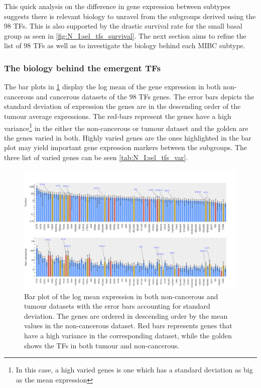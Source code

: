 This quick analysis on the difference in gene expression between subtypes suggests there is relevant biology to unravel from the subgroups derived using the 98 TFs. This is also supported by the drastic survival rate for the small basal group as seen in \cref{fig:N_I:sel_tfs_survival}. The next section aims to refine the list of 98 TFs as well as to investigate the biology behind each MIBC subtype.

\subsubsection{The biology behind the emergent TFs} \label{s:N_I:sel_tfs_bio}

The bar plots in \cref{fig:N_I:sel_tfs_var} display the log mean of the gene expression in both non-cancerous and cancerous datasets of the 98 TFs genes. The error bars depicts the standard deviation of expression the genes are in the descending order of the tumour average expressions. The red-bars represent the genes have a high variance\footnote{In this case, a high varied genes is one which has a standard deviation as big as the mean expression} in the either the non-cancerous or tumour dataset and the golden are the genes varied in both. Highly varied genes are the ones highlighted in the bar plot may yield important gene expression markers between the subgroups. The three list of varied genes can be seen \cref{tab:N_I:sel_tfs_var}.


\begin{figure}[!ht]   
\centering
\includegraphics[width=1.0\textwidth,height=1.0\textheight,keepaspectratio]{Sections/Network_I/Resources/selective_pruning/sel_tfs_var_tum_healthy.png}
  \caption{Bar plot of the log mean expression in both non-cancerous and tumour datasets with the error bars accounting for standard deviation. The genes are ordered in descending order by the mean values in the non-cancerous dataset. Red bars represents genes that have a high variance in the corresponding dataset, while the golden shows the TFs in both tumour and non-cancerous.}
\label{fig:N_I:sel_tfs_var}
\end{figure}

